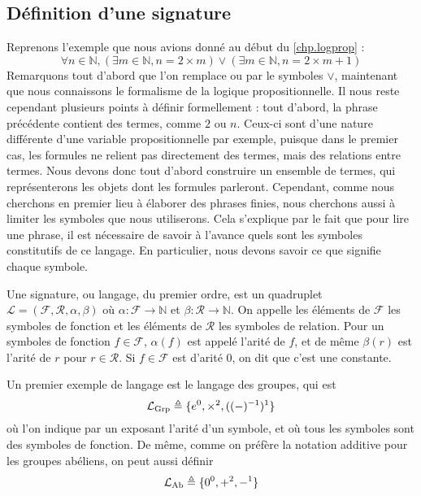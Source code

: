 \subsection{Définition d'une signature}

Reprenons l'exemple que nous avions donné au début du \cref{chp.logprop} :
\[\forall n \in \mathbb N, (\exists m \in \mathbb N, n = 2\times m) \lor
(\exists m \in \mathbb N, n = 2 \times m + 1)\]
Remarquons tout d'abord que l'on remplace \og ou\fg{} par le symboles $\lor$,
maintenant que nous connaissons le formalisme de la logique propositionnelle.
Il nous reste cependant plusieurs points à définir formellement : tout d'abord,
la phrase précédente contient des termes, comme $2$ ou $n$. Ceux-ci sont d'une
nature différente d'une variable propositionnelle par exemple, puisque dans le
premier cas, les formules ne relient pas directement des termes, mais des
relations entre termes. Nous devons donc tout d'abord construire un ensemble de
termes, qui représenterons les objets dont les formules parleront. Cependant,
comme nous cherchons en premier lieu à élaborer des phrases finies, nous
cherchons aussi à limiter les symboles que nous utiliserons. Cela s'explique par
le fait que pour lire une phrase, il est nécessaire de savoir à l'avance quels
sont les symboles constitutifs de ce langage. En particulier, nous devons savoir
ce que signifie chaque symbole.

\begin{definition}[Signature]
  Une signature, ou langage, du premier ordre, est un quadruplet $\mathcal L =
  (\mathcal F,\mathcal R, \alpha,\beta)$ où $\alpha : \mathcal F \to \mathbb N$
  et $\beta : \mathcal R \to \mathbb N$. On appelle les éléments de $\mathcal F$
  les symboles de fonction et les éléments de $\mathcal R$ les symboles de
  relation. Pour un symboles de fonction $f\in\mathcal F$, $\alpha(f)$ est appelé
  l'arité de $f$, et de même $\beta(r)$ est l'arité de $r$ pour $r\in\mathcal R$.
  Si $f\in\mathcal F$ est d'arité $0$, on dit que c'est une constante.
\end{definition}

\begin{example}
  Un premier exemple de langage est le langage des groupes, qui est
  \[\mathcal L_{\mathrm{Grp}} \triangleq \{e^0,\times^2,((-)^{-1})^1\}\]
  où l'on indique par un exposant l'arité d'un symbole, et où tous les symboles
  sont des symboles de fonction. De même, comme on préfère la notation additive
  pour les groupes abéliens, on peut aussi définir
  \[\mathcal L_{\mathrm{Ab}} \triangleq \{0^0,+^2,-^1\}\]
\end{example}

